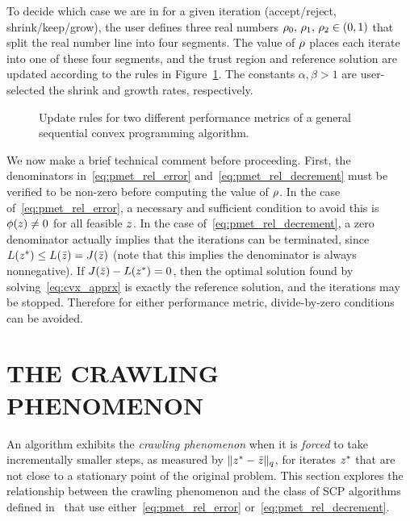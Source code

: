 \documentclass[letterpaper, 10 pt, conference]{ieeeconf}
\begin{document}
To decide which case we are in for a given iteration (accept/reject, shrink/keep/grow), the user defines three real numbers $\rho_0,\,\rho_1,\,\rho_2\in(0,1)$ that split the real number line into four segments. The value of $\rho$ places each iterate into one of these four segments, and the trust region and reference solution are updated according to the rules in Figure~\ref{fig:scp_updates}. The constants $\alpha,\beta >1$ are user-selected the shrink and growth rates, respectively. 

\begin{figure}
\centering

\caption{Update rules for two different performance metrics of a general sequential convex programming algorithm.}
\label{fig:scp_updates}
\end{figure}

We now make a brief technical comment before proceeding. First, the denominators in~\eqref{eq:pmet_rel_error} and~\eqref{eq:pmet_rel_decrement} must be verified to be non-zero before computing the value of $\rho$. In the case of~\eqref{eq:pmet_rel_error}, a necessary and sufficient condition to avoid this is $\phi(z)\ne0$ for all feasible $z$. In the case of~\eqref{eq:pmet_rel_decrement}, a zero denominator actually implies that the iterations can be terminated, since $L(z^*) \leq L(\bar{z}) = J(\bar{z})$ (note that this implies the denominator is always nonnegative). If $J(\bar{z})-L(z^*)=0$, then the optimal solution found by solving~\eqref{eq:cvx_apprx} is exactly the reference solution, and the iterations may be stopped. Therefore for either performance metric, divide-by-zero conditions can be avoided.   

\section{THE CRAWLING PHENOMENON}\label{sec:crawling}


An algorithm exhibits the \textit{crawling phenomenon} when it is \textit{forced} to take incrementally smaller steps, as measured by $\|z^*-\bar{z}\|_q$, for iterates $z^*$ that are not close to a stationary point of the original problem. This section explores the relationship between the crawling phenomenon and the class of SCP algorithms defined in~ that use either~\eqref{eq:pmet_rel_error} or~\eqref{eq:pmet_rel_decrement}.
\end{document}
